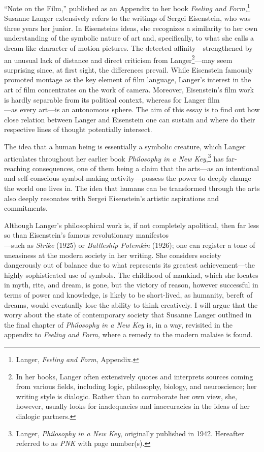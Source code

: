 \documentclass{tufte-handout}
\begin{document}
 ``Note on the Film,'' published as an Appendix to her book
\emph{Feeling and Form},\footnote{Langer, \emph{Feeling and Form},
  Appendix.} Susanne Langer extensively refers to the writings of Sergei
Eisenstein, who was three years her junior. In
Eisenstein\textquotesingle s ideas, she recognizes a similarity to her
own understanding of the symbolic nature of art and, specifically, to
what she calls a dream-like character of motion pictures. The detected
affinity---strengthened by an unusual lack of distance and direct
criticism from Langer\footnote{In her books, Langer often extensively
  quotes and interprets sources coming from various fields, including
  logic, philosophy, biology, and neuroscience; her writing style is
  dialogic. Rather than to corroborate her own view, she, however,
  usually looks for inadequacies and inaccuracies in the ideas of her
  dialogic partners.}---may seem surprising since, at first sight, the
differences prevail. While Eisenstein famously promoted montage as the
key element of film language, Langer's interest in the art of film
concentrates on the work of camera. Moreover, Eisenstein's film work is
hardly separable from its political context, whereas for Langer
film\\\noindent---as every art---is an autonomous sphere. The aim of this essay is
to find out how close relation between Langer and Eisenstein one can
sustain and where do their respective lines of thought potentially
intersect.

The idea that a human being is essentially a symbolic creature, which
Langer articulates throughout her earlier book \emph{Philosophy in a New
Key},\footnote{Langer, \emph{Philosophy in a New Key}, originally
  published in 1942. Hereafter referred to as \emph{PNK} with page
  number(s).} has far-reaching consequences, one of them being a claim
that the arts---as an intentional and self-conscious symbol-making
activity---possess the power to deeply change the world one lives in.
The idea that humans can be transformed through the arts also deeply
resonates with Sergei Eisenstein's artistic aspirations and commitments.

Although Langer's philosophical work is, if not completely apolitical,
then far less so than Eisenstein's famous revolutionary
manifestos\\\noindent---such as \emph{Strike} (1925) or \emph{Battleship Potemkin}
(1926); one can register a tone of uneasiness at the modern society in
her writing. She considers society dangerously out of balance due to
what represents its greatest achievement---the highly sophisticated use
of symbols. The childhood of mankind, which she locates in myth, rite,
and dream, is gone, but the victory of reason, however successful in
terms of power and knowledge, is likely to be short-lived, as humanity,
bereft of dreams, would eventually lose the ability to think creatively.
I will argue that the worry about the state of contemporary society that
Susanne Langer outlined in the final chapter of \emph{Philosophy in a
New Key} is, in a way, revisited in the appendix to \emph{Feeling and
Form}, where a remedy to the modern malaise is found.
\end{document}
